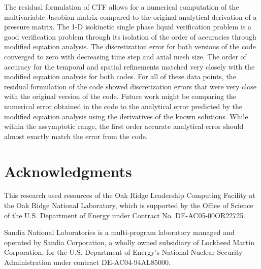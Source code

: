 \documentclass{mc2015}
\begin{document}
The residual formulation of CTF allows for a numerical computation of the
multivariable Jacobian matrix compared to the original analytical derivation of
a pressure matrix. The 1-D isokinetic single phase liquid verification problem
is a good verification problem through its isolation of the order
of accuracies through modified equation analysis. The discretization error for
both versions of the code converged to zero with decreasing time step and axial
mesh size. The order of accuracy for the temporal and spatial refinements
matched very closely with the modified equation analysis for both codes. For all
of these data points, the residual formulation of the code showed discretization
errors that were very close with the original version of the code. Future work
might be comparing the numerical error obtained in the code to the analytical
error predicted by the modified equation analysis using the derivatives of the
known solutions. While within the assymptotic range, the first order accurate
analytical error should almost exactly match the error from the code.

\section{Acknowledgments}

This research used resources of the Oak Ridge Leadership Computing
Facility at the Oak Ridge National Laboratory, which is supported
by the Office of Science of the U.S. Department of Energy
under Contract No. DE-AC05-00OR22725.

Sandia National Laboratories is a multi-program laboratory
managed and operated by Sandia Corporation, a wholly owned
subsidiary of Lockheed Martin Corporation, for the U.S. Department
of Energy’s National Nuclear Security Administration under
contract DE-AC04-94AL85000.

\setlength{\baselineskip}{12pt}





\end{document}

